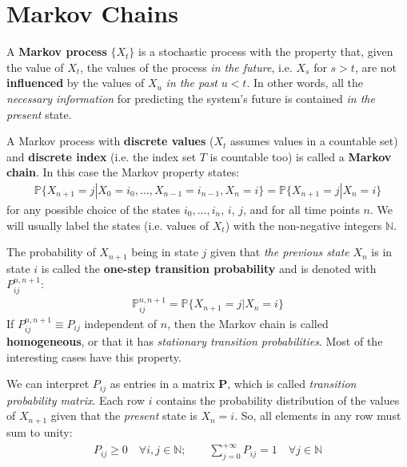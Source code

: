 \documentclass[../template.tex]{subfiles}
\begin{document}
\chapter{Markov Chains}
A \textbf{Markov process} $\{X_t\}$ is a stochastic process with the property that, given the value of $X_t$, the values of the process \textit{in the future}, i.e. $X_s$ for $s > t$, are not \textbf{influenced} by the values of $X_u$ \textit{in the past} $u < t$. In other words, all the \textit{necessary information} for predicting the system's future is contained \textit{in the present} state.

\medskip

A Markov process with \textbf{discrete values} ($X_t$ assumes values in a countable set) and \textbf{discrete index} (i.e. the index set $T$ is countable too) is called a \textbf{Markov chain}. In this case the Markov property states:
\begin{align*}
    \mathbb{P}\{X_{n+1} = j|X_0 = i_0, \dots, X_{n-1}=i_{n-1}, X_n=i\} = \mathbb{P}\{X_{n+1}=j|X_n=i\}
\end{align*} 
for any possible choice of the states $i_0, \dots, i_n$, $i$, $j$, and for all time points $n$. We will usually label the states (i.e. values of $X_t$) with the non-negative integers $\mathbb{N}$.

\medskip

The probability of $X_{n+1}$ being in state $j$ given that \textit{the previous state} $X_n$ is in state $i$ is called the \textbf{one-step transition probability} and is denoted with $P_{ij}^{n, n+1}$:
\begin{align*}
    \mathbb{P}_{ij}^{n, n+1} = \mathbb{P}\{X_{n+1} = j | X_n = i\}
\end{align*} 
If $P_{ij}^{n, n+1} \equiv P_{ij}$ independent of $n$, then the Markov chain is called \textbf{homogeneous}, or that it has \textit{stationary transition probabilities}. Most of the interesting cases have this property.

We can interpret $P_{ij}$ as entries in a matrix \textbf{P}, which is called \textit{transition probability matrix}. Each row $i$ contains the probability distribution of the values of $X_{n+1}$ given that the \textit{present} state is $X_n = i$. So, all elements in any row must sum to unity:
\begin{align*}
    P_{ij} \geq 0 \quad \forall i,j \in \mathbb{N}; \qquad \sum_{j=0}^{+\infty} P_{ij} = 1 \quad \forall j \in \mathbb{N}
\end{align*} 
\end{document}
